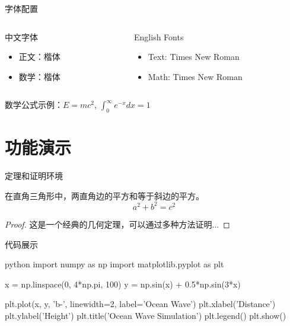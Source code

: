 \documentclass{beamer}
\begin{document}
\begin{frame}{字体配置}
    \begin{columns}
        \begin{column}{0.5\textwidth}
            \begin{block}{中文字体}
                \begin{itemize}
                    \item 正文：楷体
                    \item 数学：楷体
                \end{itemize}
            \end{block}
        \end{column}
        \begin{column}{0.5\textwidth}
            \begin{exampleblock}{English Fonts}
                \begin{itemize}
                    \item Text: Times New Roman
                    \item Math: Times New Roman
                \end{itemize}
            \end{exampleblock}
        \end{column}
    \end{columns}
    
    \vskip 1cm
    数学公式示例：$E = mc^2$, $\int_0^\infty e^{-x} dx = 1$
\end{frame}

\section{功能演示}

\begin{frame}{定理和证明环境}
    \begin{theorem}[勾股定理]
        在直角三角形中，两直角边的平方和等于斜边的平方。
        $$a^2 + b^2 = c^2$$
    \end{theorem}
    
    \begin{proof}
        这是一个经典的几何定理，可以通过多种方法证明...
    \end{proof}
\end{frame}

\begin{frame}[fragile]{代码展示}
    \begin{code}[Python代码示例]{python}
import numpy as np
import matplotlib.pyplot as plt

x = np.linspace(0, 4*np.pi, 100)
y = np.sin(x) + 0.5*np.sin(3*x)

plt.plot(x, y, 'b-', linewidth=2, label='Ocean Wave')
plt.xlabel('Distance')
plt.ylabel('Height')
plt.title('Ocean Wave Simulation')
plt.legend()
plt.show()
    \end{code}
\end{frame}
\end{document}
